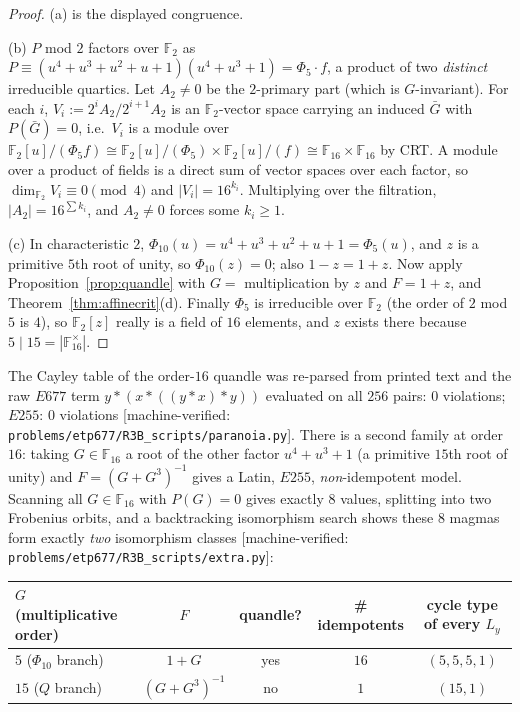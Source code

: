 \documentclass[11pt]{article}
\theoremstyle{plain}
\theoremstyle{definition}
\theoremstyle{remark}
\numberwithin{equation}{section}
\newcommand{\F}{\mathbb{F}}
\newcommand{\op}{\mathbin{*}}
\newcommand{\statusbox}[1]{{\small\sloppy\textsf{[#1]}}}
\newcommand{\MV}[1]{\statusbox{machine-verified: \texttt{#1}}}
\begin{document}
\begin{proof}
(a) is the displayed congruence.

(b) $P$ mod $2$ factors over $\F_2$ as
$P \equiv (u^4+u^3+u^2+u+1)(u^4+u^3+1) = \Phi_5\cdot f$, a product of two \emph{distinct}
irreducible quartics. Let $A_2\ne 0$ be the $2$-primary part (which is $G$-invariant). For
each $i$, $V_i := 2^iA_2/2^{i+1}A_2$ is an $\F_2$-vector space carrying an induced
$\bar G$ with $P(\bar G) = 0$, i.e.\ $V_i$ is a module over
$\F_2[u]/(\Phi_5 f) \cong \F_2[u]/(\Phi_5)\times \F_2[u]/(f) \cong \F_{16}\times\F_{16}$ by
CRT. A module over a product of fields is a direct sum of vector spaces over each factor, so
$\dim_{\F_2}V_i \equiv 0 \pmod 4$ and $|V_i| = 16^{k_i}$. Multiplying over the filtration,
$|A_2| = 16^{\sum k_i}$, and $A_2\ne 0$ forces some $k_i\ge 1$.

(c) In characteristic $2$, $\Phi_{10}(u) = u^4+u^3+u^2+u+1 = \Phi_5(u)$, and $z$ is a
primitive $5$th root of unity, so $\Phi_{10}(z) = 0$; also $1-z = 1+z$. Now apply
Proposition~\ref{prop:quandle} with $G = $ multiplication by $z$ and $F = 1+z$, and
Theorem~\ref{thm:affinecrit}(d). Finally $\Phi_5$ is irreducible over $\F_2$ (the order of
$2$ mod $5$ is $4$), so $\F_2[z]$ really is a field of $16$ elements, and $z$ exists there
because $5\mid 15 = |\F_{16}^{\times}|$.
\end{proof}

The Cayley table of the order-$16$ quandle was re-parsed from printed text and the raw $E677$
term $y\op(x\op((y\op x)\op y))$ evaluated on all $256$ pairs: $0$ violations; $E255$: $0$
violations \MV{problems\slash etp677\slash R3B\_scripts\slash paranoia.py}. There is a second family at order
$16$: taking $G\in\F_{16}$ a root of the other factor $u^4+u^3+1$ (a primitive $15$th root of
unity) and $F = (G+G^3)^{-1}$ gives a Latin, $E255$, \emph{non}-idempotent model. Scanning all
$G\in\F_{16}$ with $P(G)=0$ gives exactly $8$ values, splitting into two Frobenius orbits, and
a backtracking isomorphism search shows these $8$ magmas form exactly \emph{two} isomorphism
classes \MV{problems\slash etp677\slash R3B\_scripts\slash extra.py}:

\begin{center}
\begin{tabular}{lcccc}
\toprule
$G$ (multiplicative order) & $F$ & quandle? & \# idempotents & cycle type of every $L_y$\\
\midrule
$5$ \quad ($\Phi_{10}$ branch) & $1+G$ & yes & $16$ & $(5,5,5,1)$\\
$15$ \quad ($Q$ branch) & $(G+G^3)^{-1}$ & no & $1$ & $(15,1)$\\
\bottomrule
\end{tabular}
\end{center}
\end{document}
